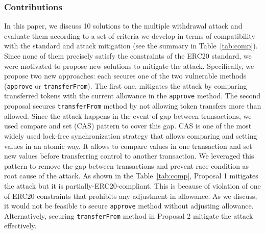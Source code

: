 \subsubsection*{Contributions} In this paper, we discuss 10 solutions to the multiple withdrawal attack and evaluate them according to a set of criteria we develop in terms of compatibility with the standard and attack mitigation (see the summary in Table~\ref{tab:comp}). Since none of them precisely satisfy the constraints of the ERC20 standard, we were motivated to propose new solutions to mitigate the attack. Specifically, we propose  two new approaches: each secures one of the two vulnerable methods (\ie \texttt{approve} or \texttt{transferFrom}). The first one, mitigates the attack by comparing transferred tokens with the current allowance in the \texttt{approve} method. The second proposal secures \texttt{transferFrom} method by not allowing token transfers more than allowed. Since the attack happens in the event of gap between transactions, we used compare and set (CAS) pattern\cite{Ref06} to cover this gap. CAS is one of the most widely used lock-free synchronization strategy that allows comparing and setting values in an atomic way. It allows to compare values in one transaction and set new values before transferring control to another transaction. We leveraged this pattern to remove the gap between transactions and prevent race condition as root cause of the attack. As shown in the Table~\ref{tab:comp}, Proposal 1 mitigates the attack but it is partially-ERC20-compliant. This is because of violation of one of ERC20 constraints that prohibits any adjustment in allowance. As we discuss, it would not be feasible to secure \texttt{approve} method without adjusting allowance. Alternatively, securing \texttt{transferFrom} method in Proposal 2 mitigate the attack effectively.

